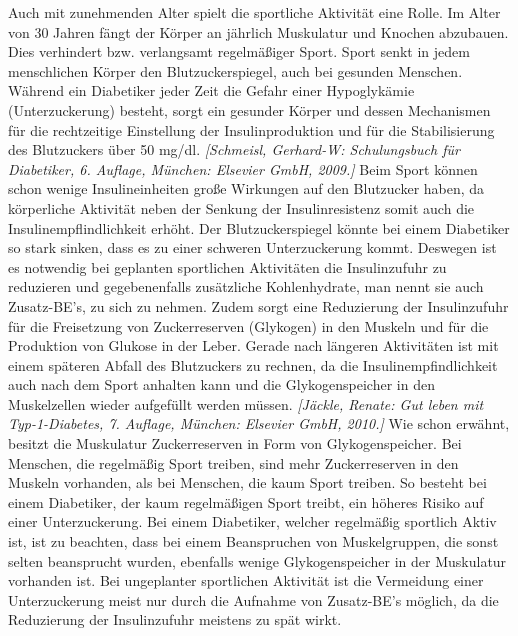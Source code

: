 \documentclass[a4paper,11pt]{article}%
\renewcommand{\\}{\vspace*{0.5\baselineskip} \newline}
\begin{document}
	Auch mit zunehmenden Alter spielt die sportliche Aktivität eine Rolle. Im Alter von 30 Jahren fängt der Körper an jährlich Muskulatur und Knochen abzubauen. Dies verhindert bzw. verlangsamt regelmäßiger Sport. \newline
	Sport senkt in jedem menschlichen Körper den Blutzuckerspiegel, auch bei gesunden Menschen. Während ein Diabetiker jeder Zeit die Gefahr einer Hypoglykämie (Unterzuckerung) besteht, sorgt ein gesunder Körper und dessen Mechanismen für die rechtzeitige Einstellung der Insulinproduktion und für die Stabilisierung des Blutzuckers über 50 mg/dl. \emph{[Schmeisl, Gerhard-W: Schulungsbuch für Diabetiker, 6. Auflage, München: Elsevier GmbH, 2009.]} 
	Beim Sport können schon wenige Insulineinheiten große Wirkungen auf den Blutzucker haben, da körperliche Aktivität neben der Senkung der Insulinresistenz somit auch die Insulinempflindlichkeit erhöht. Der Blutzuckerspiegel könnte bei einem Diabetiker so stark sinken, dass es zu einer schweren Unterzuckerung kommt. Deswegen ist es notwendig bei geplanten sportlichen Aktivitäten die Insulinzufuhr zu reduzieren und gegebenenfalls zusätzliche Kohlenhydrate, man nennt sie auch Zusatz-BE’s, zu sich zu nehmen. Zudem sorgt eine Reduzierung der Insulinzufuhr für die Freisetzung von Zuckerreserven (Glykogen) in den Muskeln und für die Produktion von Glukose in der Leber. Gerade nach längeren Aktivitäten ist mit einem späteren Abfall des Blutzuckers zu rechnen, da die Insulinempfindlichkeit auch nach dem Sport anhalten kann und die Glykogenspeicher in den Muskelzellen wieder aufgefüllt werden müssen. \emph{[Jäckle, Renate: Gut leben mit Typ-1-Diabetes, 7. Auflage, München: Elsevier GmbH, 2010.]}\newline
	Wie schon erwähnt, besitzt die Muskulatur Zuckerreserven in Form von Glykogenspeicher. Bei Menschen, die regelmäßig Sport treiben, sind mehr Zuckerreserven in den Muskeln vorhanden, als bei Menschen, die kaum Sport treiben. So besteht bei einem Diabetiker, der kaum regelmäßigen Sport treibt, ein höheres Risiko auf einer Unterzuckerung. Bei einem Diabetiker, welcher regelmäßig sportlich Aktiv ist, ist zu beachten, dass bei einem Beanspruchen von Muskelgruppen, die sonst selten beansprucht wurden, ebenfalls wenige Glykogenspeicher in der Muskulatur vorhanden ist.\newline
	Bei ungeplanter sportlichen Aktivität ist die Vermeidung einer Unterzuckerung meist nur durch die Aufnahme von Zusatz-BE’s möglich, da die Reduzierung der Insulinzufuhr meistens zu spät wirkt.\newline
\end{document}
